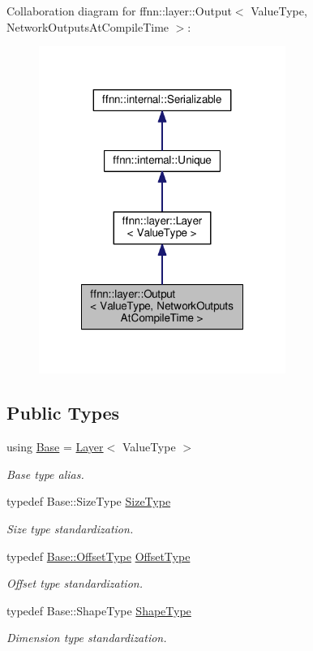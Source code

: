 Collaboration diagram for ffnn\-:\-:layer\-:\-:Output$<$ Value\-Type, Network\-Outputs\-At\-Compile\-Time $>$\-:\nopagebreak
\begin{figure}[H]
\begin{center}
\leavevmode
\includegraphics[width=228pt]{classffnn_1_1layer_1_1_output__coll__graph}
\end{center}
\end{figure}
\subsection*{Public Types}
\begin{DoxyCompactItemize}
\item 
using \hyperlink{classffnn_1_1layer_1_1_output_a76c3074490fd13bd2cdd86f53322da45}{Base} = \hyperlink{classffnn_1_1layer_1_1_layer}{Layer}$<$ Value\-Type $>$
\begin{DoxyCompactList}\small\item\em Base type alias. \end{DoxyCompactList}\item 
typedef Base\-::\-Size\-Type \hyperlink{classffnn_1_1layer_1_1_output_a5e41de6c9249494dd9c6a819d7a30e20}{Size\-Type}
\begin{DoxyCompactList}\small\item\em Size type standardization. \end{DoxyCompactList}\item 
typedef \hyperlink{classffnn_1_1layer_1_1_layer_a2130560f43788898079b7c5c01fb94c8}{Base\-::\-Offset\-Type} \hyperlink{classffnn_1_1layer_1_1_output_a6780ece144b80cb2be355dd65096e9db}{Offset\-Type}
\begin{DoxyCompactList}\small\item\em Offset type standardization. \end{DoxyCompactList}\item 
typedef Base\-::\-Shape\-Type \hyperlink{classffnn_1_1layer_1_1_output_ab3b7fdade20b477ce77b2fab91117a7f}{Shape\-Type}
\begin{DoxyCompactList}\small\item\em Dimension type standardization. \end{DoxyCompactList}\end{DoxyCompactItemize}
